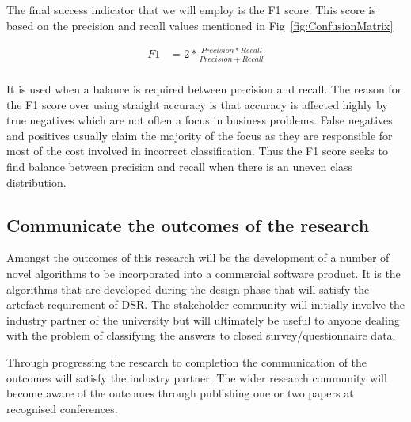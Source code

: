 

The final success indicator that we will employ is the F1 score. This score is based on the precision and recall values mentioned in Fig~\ref{fig:ConfusionMatrix}

\begin{align*}
    F1 & = 2 * \frac{Precision*Recall}{Precision+Recall} \\
\end{align*}

It is used when a balance is required between precision and recall. The reason for the F1 score over using straight accuracy is that accuracy is affected highly by true negatives which are not often a focus in business problems. False negatives and positives usually claim the majority of the focus as they are responsible for most of the cost involved in incorrect classification. Thus the F1 score seeks to find balance between precision and recall when there is an uneven class distribution.


\subsection{Communicate the outcomes of the research}


Amongst the outcomes of this research will be the development of a number of novel algorithms to be incorporated into a commercial software product. It is the algorithms that are developed during the design phase that will satisfy the artefact requirement of DSR. The stakeholder community will initially involve the industry partner of the university but will ultimately be useful to anyone dealing with the problem of classifying the answers to closed survey/questionnaire data.
\par
Through progressing the research to completion the communication of the outcomes will satisfy the industry partner. The wider research
community will become aware of the outcomes through publishing one or two papers at recognised conferences.




